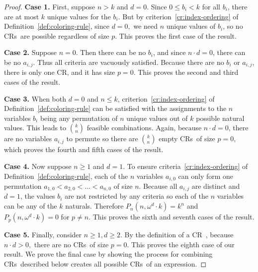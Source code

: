\documentclass[10pt,a4paper]{article}
\newcommand{\om}{\omega}
\newcommand{\crulenospace}{CR}
\newcommand{\crule}{\crulenospace~}
\newcommand{\crules}{\crulenospace s~}
\newcommand{\case}[1]{\textbf{Case #1.}}
\newcommand{\numpoints}{n}
\newcommand{\inumpoints}{i}
\newcommand{\idegr}{j}
\newcommand{\commonconst}{a}
\newcommand{\rareconst}{b}
\theoremstyle{plain}
\theoremstyle{definition}
\begin{document}
\begin{proof}
\case{1} First, suppose $\numpoints > k$ and $d = 0$. Since $0 \leq \rareconst_{\inumpoints} < k$ for all $\rareconst_{\inumpoints}$, there are at most $k$
unique values for the $\rareconst_{\inumpoints}$. But by criterion~\ref{cr:index-ordering} of Definition~\ref{def:coloring-rule}, since $d = 0,$ we need $\numpoints$ unique values of $\rareconst_{\inumpoints}$, so no \crules are possible regardless of size $p$. This proves the first case of the result.

\case{2} Suppose $\numpoints = 0$. Then there can be no $\rareconst_{\inumpoints}$, and since $\numpoints \cdot d = 0$, there can be no $\commonconst_{\inumpoints,\idegr}$. Thus all criteria are vacuously satisfied. Because there are no $\rareconst_{\inumpoints}$ or $\commonconst_{\inumpoints,\idegr}$, there is only one \crulenospace, and it has size $p = 0$. This proves the second and third cases of the result.

\case{3} When both $d = 0$ and $\numpoints \leq k$,
criterion~\ref{cr:index-ordering} of Definition~\ref{def:coloring-rule} can be satisfied with the assignments to the $\numpoints$ variables $\rareconst_{\inumpoints}$ being any permutation of $\numpoints$ unique values out of $k$ possible natural values.
This leads to $\binom{k}{\numpoints}$ feasible combinations. Again, because $\numpoints \cdot d = 0$, there are no variables $\commonconst_{\inumpoints,\idegr}$ to permute so there are $\binom{k}{\numpoints}$ empty \crules of size $p=0$, which proves the fourth and fifth cases of the result.

\case{4} Now suppose $\numpoints \geq 1$ and $d = 1$. To ensure criteria~\ref{cr:index-ordering} of Definition~\ref{def:coloring-rule}, each of the $\numpoints$ variables  $\commonconst_{\inumpoints,0}$ can only form one permutation $\commonconst_{1,0} < \commonconst_{2,0} < \ldots < \commonconst_{\numpoints,0}$ of size $\numpoints$. Because all $\commonconst_{\inumpoints,\idegr}$ are distinct and $d = 1$, the values $\rareconst_{\inumpoints}$ are not restricted by any criteria so each of the $\numpoints$ variables can be any of the $k$ naturals. Therefore $P_{\numpoints}\left(\numpoints, \om^d \cdot k \right) = k^{\numpoints}$ and $P_p\left(\numpoints, \om^d \cdot k \right) = 0$ for $p \neq \numpoints$. This proves the sixth and seventh cases of the result.

\case{5} Finally, consider $\numpoints \geq 1, d \geq 2$. By the definition of a \crule, because $\numpoints \cdot d > 0,$ there are no \crules of size $p=0.$ This proves the eighth
case of our result. We prove the final case by showing the process for combining \crules described below creates all possible \crules of an expression.


\end{proof}
\end{document}
